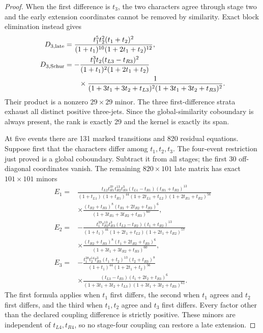 \begin{proof}
When the first difference is \(t_3\), the two characters agree through
stage two and the early extension coordinates cannot be removed by
similarity.  Exact block elimination instead gives
\begin{align}
D_{3,\mathrm{late}}
&=\frac{t_1^5t_2^2(t_1+t_2)^2}
{(1+t_1)^{10}(1+2t_1+t_2)^{12}},\\
D_{3,\mathrm{Schur}}
&=-\frac{t_1^3t_2(t_{L3}-t_{R3})^2}
{(1+t_1)^2(1+2t_1+t_2)}
\nonumber\\
&\hspace{7mm}\times
\frac{1}
{(1+3t_1+3t_2+t_{L3})^2
(1+3t_1+3t_2+t_{R3})^2}.
\label{eq:bcgr-minor-t3}
\end{align}
Their product is a nonzero \(29\times29\) minor.  The three
first-difference strata exhaust all distinct positive three-jets.  Since
the global-similarity coboundary is always present, the rank is exactly 29
and the kernel is exactly its span.

At five events there are 131 marked transitions and 820 residual
equations.  Suppose first that the characters differ among
\(t_1,t_2,t_3\).  The four-event restriction just proved is a global
coboundary.  Subtract it from all stages; the first 30 off-diagonal
coordinates vanish.  The remaining \(820\times101\) late matrix has exact
\(101\times101\) minors
\begin{align}
E_1={}&
\frac{t_{L2}t_{R1}^{37}t_{R2}^{13}t_{R3}^{3}
(t_{L1}-t_{R1})(t_{R1}+t_{R2})^{13}}
{(1+t_{L1})(1+t_{R1})^{44}
(1+2t_{L1}+t_{L2})(1+2t_{R1}+t_{R2})^{56}}
\nonumber\\[-1mm]
&\times
\frac{(t_{R2}+t_{R3})^8(t_{R1}+2t_{R2}+t_{R3})^6}
{(1+3t_{R1}+3t_{R2}+t_{R3})^{60}},
\label{eq:bcgr-five-t1}\\
E_2={}&-
\frac{t_1^{39}t_{R2}^{13}t_{R3}^{3}
(t_{L2}-t_{R2})(t_1+t_{R2})^{13}}
{(1+t_1)^{44}(1+2t_1+t_{L2})
(1+2t_1+t_{R2})^{57}}
\nonumber\\[-1mm]
&\times
\frac{(t_{R2}+t_{R3})^8(t_1+2t_{R2}+t_{R3})^6}
{(1+3t_1+3t_{R2}+t_{R3})^{60}},
\label{eq:bcgr-five-t2}\\
E_3={}&-
\frac{t_1^{38}t_2^{14}t_{R3}^{3}
(t_1+t_2)^{13}(t_2+t_{R3})^8}
{(1+t_1)^{44}(1+2t_1+t_2)^{56}}
\nonumber\\[-1mm]
&\times
\frac{(t_{L3}-t_{R3})(t_1+2t_2+t_{R3})^6}
{(1+3t_1+3t_2+t_{L3})
(1+3t_1+3t_2+t_{R3})^{61}} .
\label{eq:bcgr-five-t3}
\end{align}
The first formula applies when \(t_1\) first differs, the second when
\(t_1\) agrees and \(t_2\) first differs, and the third when \(t_1,t_2\)
agree and \(t_3\) first differs.  Every factor other than the declared
coupling difference is strictly positive.  These minors are independent of
\(t_{L4},t_{R4}\), so no stage-four coupling can restore a late extension.


\end{proof}

